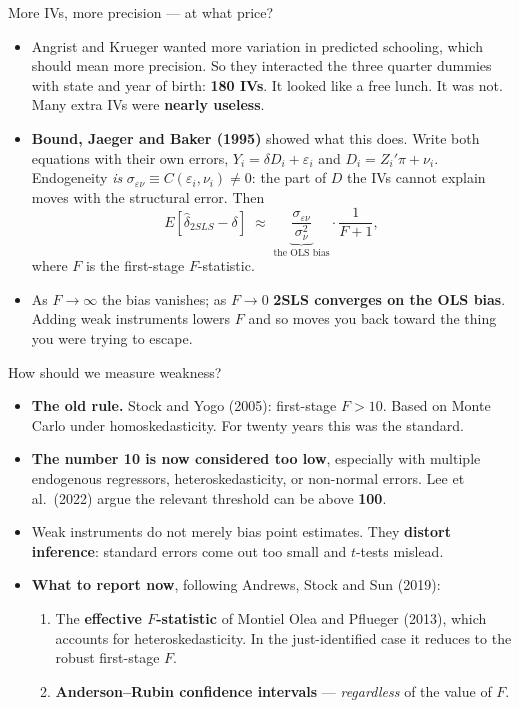 \documentclass[
  11pt,
  ignorenonframetext,
  aspectratio=169,
]{beamer}
\providecommand{\tightlist}{%
  \setlength{\itemsep}{0pt}\setlength{\parskip}{0pt}}
\begin{document}
\begin{frame}{More IVs, more precision --- at what price?}
\protect{}\label{more-ivs-more-precision-at-what-price}
\small

\begin{itemize}
\tightlist
\item
  Angrist and Krueger wanted more variation in predicted schooling,
  which should mean more precision. So they interacted the three quarter
  dummies with state and year of birth: \textbf{180 IVs}. It looked like
  a free lunch. It was not. Many extra IVs were \textbf{nearly useless}.
\item
  \textbf{Bound, Jaeger and Baker (1995)} showed what this does. Write
  both equations with their own errors,
  \(Y_i = \delta D_i + \varepsilon_i\) and \(D_i = Z_i'\pi + \nu_i\).
  Endogeneity \emph{is}
  \(\sigma_{\varepsilon\nu} \equiv C(\varepsilon_i,\nu_i) \neq 0\): the
  part of \(D\) the IVs cannot explain moves with the structural error.
  Then \[
  E[\hat\delta_{2SLS} - \delta] \;\approx\; \underbrace{\frac{\sigma_{\varepsilon\nu}}{\sigma_\nu^{2}}}_{\text{the OLS bias}} \cdot \frac{1}{F + 1},
  \] where \(F\) is the first-stage \(F\)-statistic.
\item
  As \(F \to \infty\) the bias vanishes; as \(F \to 0\) \textbf{2SLS
  converges on the OLS bias}. Adding weak instruments lowers \(F\) and
  so moves you back toward the thing you were trying to escape.
\end{itemize}
\end{frame}

\begin{frame}{How should we measure weakness?}
\protect{}\label{how-should-we-measure-weakness}
\begin{itemize}
\tightlist
\item
  \textbf{The old rule.} Stock and Yogo (2005): first-stage \(F > 10\).
  Based on Monte Carlo under homoskedasticity. For twenty years this was
  the standard.
\item
  \textbf{The number 10 is now considered too low}, especially with
  multiple endogenous regressors, heteroskedasticity, or non-normal
  errors. Lee et al.~(2022) argue the relevant threshold can be above
  \textbf{100}.
\item
  Weak instruments do not merely bias point estimates. They
  \textbf{distort inference}: standard errors come out too small and
  \(t\)-tests mislead.
\item
  \textbf{What to report now}, following Andrews, Stock and Sun (2019):

  \begin{enumerate}
  \tightlist
  \item
    The \textbf{effective \(F\)-statistic} of Montiel Olea and Pflueger
    (2013), which accounts for heteroskedasticity. In the
    just-identified case it reduces to the robust first-stage \(F\).
  \item
    \textbf{Anderson--Rubin confidence intervals} --- \emph{regardless}
    of the value of \(F\).
  \end{enumerate}
\end{itemize}
\end{frame}
\end{document}
